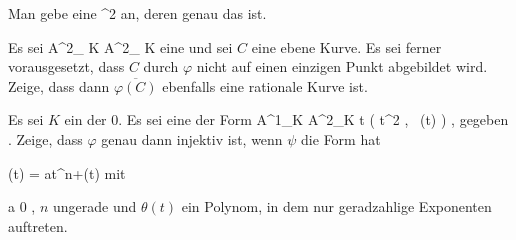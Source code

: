 {}
{





Man gebe eine
 {\R} {\R^2
} {}
an, deren
genau das
ist.





}
{} {}

{}
{





Es sei
\maabb {\varphi} { {\mathbb A}^{2}_{ K }  } { {\mathbb A}^{2}_{ K }
} {}
eine
und sei $C$ eine ebene
Kurve. Es sei ferner vorausgesetzt, dass $C$ durch $\varphi$ nicht auf einen einzigen Punkt abgebildet wird. Zeige, dass dann $\overline{\varphi(C)}$ ebenfalls eine rationale Kurve ist.





}
{} {}

{}
{





Es sei $K$ ein
der
$0$. Es sei eine
der Form
\maabbeledisp {\varphi} { {\mathbb A}^{1}_{K} } { {\mathbb A}^{2}_{K}
} { t } {   \left(  t^2   , \,   \psi(t)                   \right)
} {,}
gegeben
 {} {.}
Zeige, dass $\varphi$ genau dann injektiv ist, wenn $\psi$ die Form hat

\mavergleichskettedisp
{\vergleichskette
{ \psi(t)
}
{ =} { at^n+\theta(t)
}
{ } {
}
{ } {
}
{ } {
}
}
{}{}{}
mit

\mavergleichskette
{\vergleichskette
{ a
}
{ \neq }{ 0
}
{  }{
}
{    }{
}
{   }{
}
}
{}{}{,}
$n$ ungerade und $\theta(t)$ ein Polynom, in dem nur geradzahlige Exponenten auftreten.





}
{} {}


